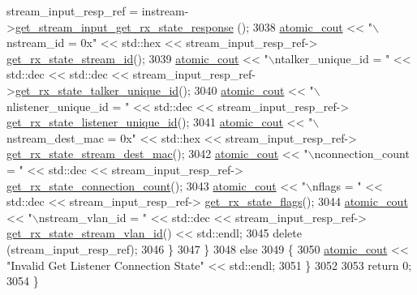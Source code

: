 \begin{DoxyCode}
      stream\_input\_resp\_ref = instream->\hyperlink{classavdecc__lib_1_1stream__input__descriptor_a16a103984d891491a224e518ace35b06}{get\_stream\_input\_get\_rx\_state\_response}
      ();
3038             \hyperlink{cmd__line_8h_a0bc38ccc65c79ba06c6fcd7b4bf554c3}{atomic\_cout} << \textcolor{stringliteral}{"\(\backslash\)nstream\_id = 0x"} << std::hex << stream\_input\_resp\_ref->
      \hyperlink{classavdecc__lib_1_1stream__input__get__rx__state__response_aa778838fbcebe5544f9914a8e58a4d59}{get\_rx\_state\_stream\_id}();
3039             \hyperlink{cmd__line_8h_a0bc38ccc65c79ba06c6fcd7b4bf554c3}{atomic\_cout} << \textcolor{stringliteral}{"\(\backslash\)ntalker\_unique\_id = "} << std::dec << std::dec << 
      stream\_input\_resp\_ref->\hyperlink{classavdecc__lib_1_1stream__input__get__rx__state__response_a2a94051c37a5a75ff635fe9f386cd2d3}{get\_rx\_state\_talker\_unique\_id}();
3040             \hyperlink{cmd__line_8h_a0bc38ccc65c79ba06c6fcd7b4bf554c3}{atomic\_cout} << \textcolor{stringliteral}{"\(\backslash\)nlistener\_unique\_id = "} << std::dec << stream\_input\_resp\_ref->
      \hyperlink{classavdecc__lib_1_1stream__input__get__rx__state__response_aa0bccb0d6ad0b1cdad76ad48da795e11}{get\_rx\_state\_listener\_unique\_id}();
3041             \hyperlink{cmd__line_8h_a0bc38ccc65c79ba06c6fcd7b4bf554c3}{atomic\_cout} << \textcolor{stringliteral}{"\(\backslash\)nstream\_dest\_mac = 0x"} << std::hex << stream\_input\_resp\_ref->
      \hyperlink{classavdecc__lib_1_1stream__input__get__rx__state__response_af3fbe91d396cd14ae6a62da61e451997}{get\_rx\_state\_stream\_dest\_mac}();
3042             \hyperlink{cmd__line_8h_a0bc38ccc65c79ba06c6fcd7b4bf554c3}{atomic\_cout} << \textcolor{stringliteral}{"\(\backslash\)nconnection\_count = "} << std::dec << stream\_input\_resp\_ref->
      \hyperlink{classavdecc__lib_1_1stream__input__get__rx__state__response_a053075d490d7b1261fe95fbe8127fdd0}{get\_rx\_state\_connection\_count}();
3043             \hyperlink{cmd__line_8h_a0bc38ccc65c79ba06c6fcd7b4bf554c3}{atomic\_cout} << \textcolor{stringliteral}{"\(\backslash\)nflags = "} << std::dec << stream\_input\_resp\_ref->
      \hyperlink{classavdecc__lib_1_1stream__input__get__rx__state__response_a5f976cc82f976b016498516710bc7912}{get\_rx\_state\_flags}();
3044             \hyperlink{cmd__line_8h_a0bc38ccc65c79ba06c6fcd7b4bf554c3}{atomic\_cout} << \textcolor{stringliteral}{"\(\backslash\)nstream\_vlan\_id = "} << std::dec << stream\_input\_resp\_ref->
      \hyperlink{classavdecc__lib_1_1stream__input__get__rx__state__response_afc54cf313418c5eba8fb03a55165b6b2}{get\_rx\_state\_stream\_vlan\_id}() << std::endl;
3045             \textcolor{keyword}{delete} (stream\_input\_resp\_ref);
3046         \}
3047     \}
3048     \textcolor{keywordflow}{else}
3049     \{
3050         \hyperlink{cmd__line_8h_a0bc38ccc65c79ba06c6fcd7b4bf554c3}{atomic\_cout} << \textcolor{stringliteral}{"Invalid Get Listener Connection State"} << std::endl;
3051     \}
3052 
3053     \textcolor{keywordflow}{return} 0;
3054 \}
\end{DoxyCode}


